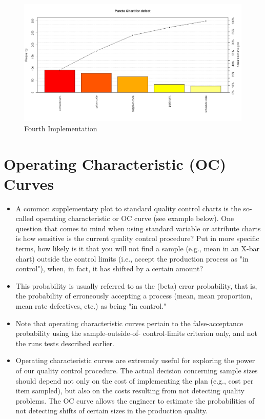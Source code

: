 \documentclass[a4paper,12pt]{article}
\begin{document}
\begin{figure}[h!]
\centering
\includegraphics[width=0.8\linewidth]{./Pareto5}
\caption{Fourth Implementation}
\label{fig:Pareto5}
\end{figure}


\newpage
\section{Operating Characteristic (OC) Curves}
\begin{itemize}
\item A common supplementary plot to standard quality control charts is the so-called operating characteristic or OC curve (see example below). One question that comes to mind when using standard variable or attribute charts is how sensitive is the current quality control procedure? Put in more specific terms, how likely is it that you will not find a sample (e.g., mean in an X-bar chart) outside the control limits (i.e., accept the production process as "in control"), when, in fact, it has shifted by a certain amount? 

\item This probability is usually referred to as the  (beta) error probability, that is, the probability of erroneously accepting a process (mean, mean proportion, mean rate defectives, etc.) as being "in control." 

\item Note that operating characteristic curves pertain to the false-acceptance probability using the sample-outside-of- control-limits criterion only, and not the runs tests described earlier.


\item Operating characteristic curves are extremely useful for exploring the power of our quality control procedure. The actual decision concerning sample sizes should depend not only on the cost of implementing the plan (e.g., cost per item sampled), but also on the costs resulting from not detecting quality problems. The OC curve allows the engineer to estimate the probabilities of not detecting shifts of certain sizes in the production quality.
\end{itemize}
\end{document}
